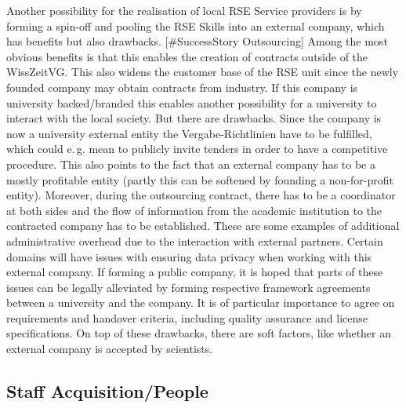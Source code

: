 \documentclass[a4paper]{article}
\makeatletter
\newcommand*{\eg}{e.\,g.\@\xspace}
\makeatother
\begin{document}
Another possibility for the realisation of local RSE Service providers is by forming a spin-off and pooling the RSE Skills into an external company, which has benefits but also drawbacks. [\#SuccessStory Outsourcing]
Among the most obvious benefits is that this enables the creation of contracts outside of the WissZeitVG.\@
This also widens the customer base of the RSE unit since the newly founded company may obtain contracts from industry.
If this company is university backed/branded this enables another possibility for a university to interact with the local society.
But there are drawbacks.
Since the company is now a university external entity the Vergabe-Richtlinien have to be fulfilled, which could \eg{} mean to publicly invite tenders in order to have a competitive procedure.
This also points to the fact that an external company has to be a mostly profitable entity (partly this can be softened by founding a non-for-profit entity).
Moreover, during the outsourcing contract, there has to be a coordinator at both sides and the flow of information from the academic institution to the contracted company has to be established.
These are some examples of additional administrative overhead due to the interaction with external partners.
Certain domains will have issues with ensuring data privacy when working with this external company.
If forming a public company, it is hoped that parts of these issues can be legally alleviated by forming respective framework agreements between a university and the company.
It is of particular importance to agree on requirements and handover criteria, including quality assurance and license specifications.
On top of these drawbacks, there are soft factors, like whether an external company is accepted by scientists.

\subsection{Staff Acquisition/People}
\end{document}
